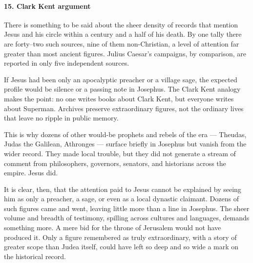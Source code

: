 \paragraph{15.
Clark Kent argument}\label{par:clark-kent-argument}

There is something to be said about the sheer density of records that mention Jesus and his circle within a century and a half of his death.
By one tally there are forty–two such sources, nine of them non-Christian, a level of attention far greater than most ancient figures.
Julius Caesar’s campaigns, by comparison, are reported in only five independent sources.

If Jesus had been only an apocalyptic preacher or a village sage, the expected profile would be silence or a passing note in Josephus.
The Clark Kent analogy makes the point: no one writes books about Clark Kent, but everyone writes about Superman.
Archives preserve extraordinary figures, not the ordinary lives that leave no ripple in public memory.

This is why dozens of other would-be prophets and rebels of the era — Theudas, Judas the Galilean, Athronges — surface briefly in Josephus but vanish from the wider record.
They made local trouble, but they did not generate a stream of comment from philosophers, governors, senators, and historians across the empire.
Jesus did.

It is clear, then, that the attention paid to Jesus cannot be explained by seeing him as only a preacher, a sage, or even as a local dynastic claimant.
Dozens of such figures came and went, leaving little more than a line in Josephus.
The sheer volume and breadth of testimony, spilling across cultures and languages, demands something more.
A mere bid for the throne of Jerusalem would not have produced it.
Only a figure remembered as truly extraordinary, with a story of greater scope than Judea itself, could have left so deep and so wide a mark on the historical record.
